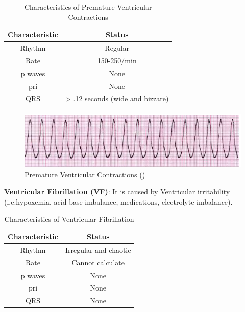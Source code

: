 \begin{table}[H]
\begin{center}
\begin{tabular}{||c || c||}
 \hline
\textbf{Characteristic} & \textbf{Status} \\ [0.4ex] 
 \hline\hline
 Rhythm & Regular \\
\hline
Rate & 150-250/min \\
\hline
p waves & None  \\
\hline
pri & None  \\
\hline
QRS & > .12 seconds (wide and bizzare) \\
\hline\hline
\end{tabular}
\end{center}
\caption{Characteristics of Premature Ventricular Contractions}
\label{table:VTach_characteristics}
\end{table}

 \begin{figure}[H]
\centering
\includegraphics[scale=0.8]{img/VTach.png}
\caption{Premature Ventricular Contractions (\cite{arryth_types})}
\label{fig:VTach}
\end{figure}

\textbf{Ventricular Fibrillation (VF)}: It is caused by Ventricular irritability (i.e.hypoxemia, acid-base imbalance, medications, electrolyte
imbalance).

\begin{table}[H]
\begin{center}
\begin{tabular}{||c || c||}
 \hline
\textbf{Characteristic} & \textbf{Status} \\ [0.4ex] 
 \hline\hline
 Rhythm & Irregular and chaotic \\
\hline
Rate & Cannot calculate \\
\hline
p waves & None  \\
\hline
pri & None  \\
\hline
QRS & None \\
\hline\hline
\end{tabular}
\end{center}
\caption{Characteristics of Ventricular Fibrillation}
\label{table:VF_characteristics}
\end{table}

